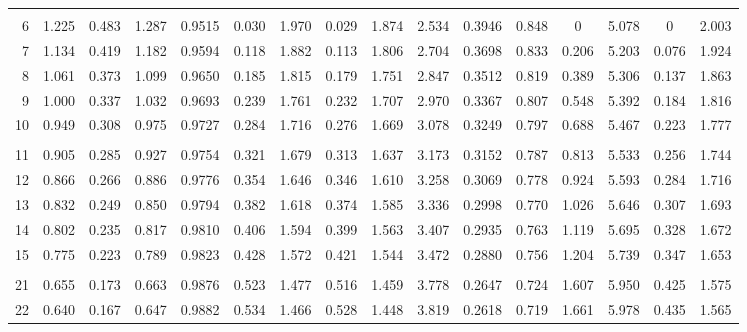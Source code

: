 \documentclass{article}
\begin{document}
\begin{tabular}{|r|c|c|c|c|c|c|c|c|c|c|c|c|c|c|c|}
       &       &        &       &       &       &       &       &
       &       &        &       &       &       &       &       \\
     6 & 1.225 & 0.483 & 1.287 & 0.9515 & 0.030 & 1.970 & 0.029 & 1.874
       & 2.534 & 0.3946 & 0.848 &   0   & 5.078 &   0   & 2.003 \\
     7 & 1.134 & 0.419 & 1.182 & 0.9594 & 0.118 & 1.882 & 0.113 & 1.806
       & 2.704 & 0.3698 & 0.833 & 0.206 & 5.203 & 0.076 & 1.924 \\
     8 & 1.061 & 0.373 & 1.099 & 0.9650 & 0.185 & 1.815 & 0.179 & 1.751
       & 2.847 & 0.3512 & 0.819 & 0.389 & 5.306 & 0.137 & 1.863 \\
     9 & 1.000 & 0.337 & 1.032 & 0.9693 & 0.239 & 1.761 & 0.232 & 1.707
       & 2.970 & 0.3367 & 0.807 & 0.548 & 5.392 & 0.184 & 1.816 \\
    10 & 0.949 & 0.308 & 0.975 & 0.9727 & 0.284 & 1.716 & 0.276 & 1.669
       & 3.078 & 0.3249 & 0.797 & 0.688 & 5.467 & 0.223 & 1.777 \\
       &       &        &       &       &       &       &       &
       &       &        &       &       &       &       &       \\
    11 & 0.905 & 0.285 & 0.927 & 0.9754 & 0.321 & 1.679 & 0.313 & 1.637
       & 3.173 & 0.3152 & 0.787 & 0.813 & 5.533 & 0.256 & 1.744 \\
    12 & 0.866 & 0.266 & 0.886 & 0.9776 & 0.354 & 1.646 & 0.346 & 1.610
       & 3.258 & 0.3069 & 0.778 & 0.924 & 5.593 & 0.284 & 1.716 \\
    13 & 0.832 & 0.249 & 0.850 & 0.9794 & 0.382 & 1.618 & 0.374 & 1.585
       & 3.336 & 0.2998 & 0.770 & 1.026 & 5.646 & 0.307 & 1.693 \\
    14 & 0.802 & 0.235 & 0.817 & 0.9810 & 0.406 & 1.594 & 0.399 & 1.563
       & 3.407 & 0.2935 & 0.763 & 1.119 & 5.695 & 0.328 & 1.672 \\
    15 & 0.775 & 0.223 & 0.789 & 0.9823 & 0.428 & 1.572 & 0.421 & 1.544
       & 3.472 & 0.2880 & 0.756 & 1.204 & 5.739 & 0.347 & 1.653 \\
       &       &        &       &       &       &       &       &
       &       &        &       &       &       &       &       \\
    21 & 0.655 & 0.173 & 0.663 & 0.9876 & 0.523 & 1.477 & 0.516 & 1.459
       & 3.778 & 0.2647 & 0.724 & 1.607 & 5.950 & 0.425 & 1.575 \\
    22 & 0.640 & 0.167 & 0.647 & 0.9882 & 0.534 & 1.466 & 0.528 & 1.448
       & 3.819 & 0.2618 & 0.719 & 1.661 & 5.978 & 0.435 & 1.565 \\

\end{tabular}
\end{document}
